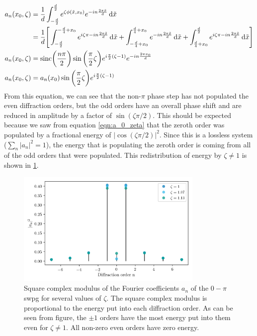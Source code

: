 \begin{equation}
\label{eqn:a_n_zeta}
	\begin{aligned}
	a_n(x_0,\zeta) &= \frac{1}{d}\int_{-\frac{d}{2}}^{\frac{d}{2}} e^{\zeta\phi(\tilde{x},x_0)}e^{-i n \frac{2\pi\tilde{x}}{d}}\mathop{}\!\mathrm{d}\tilde{x}\\
	&= \frac{1}{d}\Bigg[\int_{-\frac{d}{2}}^{-\frac{d}{4}+x_0}e^{i\zeta\pi-i n \frac{2\pi\tilde{x}}{d}} \mathop{}\!\mathrm{d}\tilde{x}
	+ \int_{-\frac{d}{4}+x_0}^{\frac{d}{4}+x_0}e^{-i n \frac{2\pi\tilde{x}}{d}} \mathop{}\!\mathrm{d}\tilde{x}
	+ \int_{\frac{d}{4}+x_0}^{\frac{d}{2}} e^{i\zeta\pi-i n \frac{2\pi\tilde{x}}{d}}\mathop{}\!\mathrm{d}\tilde{x} \Bigg]\\
	a_n(x_0, \zeta) & = \mathrm{sinc}\bigg(\frac{n\pi}{2}\bigg)\sin\bigg(\frac{\pi}{2}\zeta\bigg) e^{i\frac{\pi}{2} (\zeta - 1)} e^{-in\frac{2\pi x_0}{d}}\\
	a_n(x_0,\zeta) &= a_n(x_0)\sin\bigg(\frac{\pi}{2}\zeta\bigg)e^{i\frac{\pi}{2}(\zeta-1)}
	\end{aligned}
\end{equation} 
From this equation, we can see that the non-$\pi$ phase step has not populated the even diffraction orders, but the odd orders have an overall phase shift and are reduced in amplitude by a factor of $\sin(\zeta\pi/2)$.  This should be expected because we saw from equation \ref{eqn:a_0_zeta} that the zeroth order was populated by a fractional energy of $\rvert \cos(\zeta\pi/2)\rvert^2$.  Since this is a lossless system ($\sum_{n}\rvert a_n\rvert^2 = 1$), the energy that is populating the zeroth order is coming from all of the odd orders that were populated. This redistribution of energy by $\zeta\neq1$ is shown in \ref{fig:a_n_zeta}.

\begin{figure}
	\centering
	\includegraphics[width=0.8\textwidth]{figures/Two_source/a_n_zeta.png}
	\caption{Square complex modulus of the Fourier coefficients $a_n$ of the $0-\pi$ \gls{swpg} for several values of $\zeta$. The square complex modulus is proportional to the energy put into each diffraction order.  As can be seen from figure, the $\pm1$ orders have the most energy put into them even for $\zeta\neq 1$.  All non-zero even orders have zero energy.}
	\label{fig:a_n_zeta}
\end{figure}

